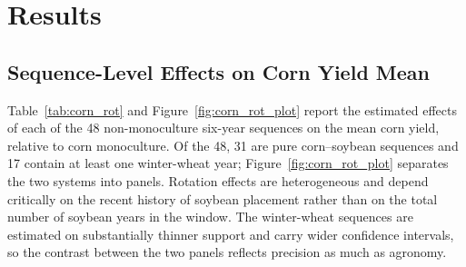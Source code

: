 \documentclass[12pt,letterpaper]{article}
\theoremstyle{remark}
\theoremstyle{remark}
\theoremstyle{plain}
\theoremstyle{definition}
\begin{document}
\section{\label{sec:results}Results}
\subsection{\label{subsec:seq_effects}Sequence-Level Effects on Corn Yield Mean}
 
Table~\ref{tab:corn_rot} and Figure~\ref{fig:corn_rot_plot} report the estimated effects of each of the 48 non-monoculture six-year sequences on the mean corn yield, relative to corn monoculture. Of the 48, 31 are pure corn--soybean sequences and 17 contain at least one winter-wheat year; Figure~\ref{fig:corn_rot_plot} separates the two systems into panels. Rotation effects are heterogeneous and depend critically on the recent history of soybean placement rather than on the total number of soybean years in the window. The winter-wheat sequences are estimated on substantially thinner support and carry wider confidence intervals, so the contrast between the two panels reflects precision as much as agronomy.
\end{document}
